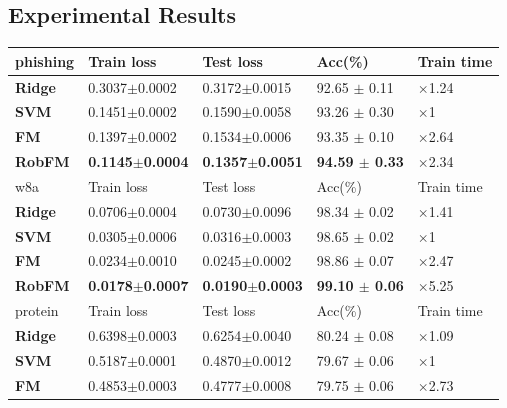 \documentclass[letterpaper]{article} %
\begin{document}
\subsection{Experimental Results}
\begin{table}
	\begin{tabu} to \textwidth {|X[c]| X[c]| X[c]| X[c]| X[c]|}
		\hline
		phishing           & Train loss & Test loss & Acc(\%) & Train time \\
		\hline
		\textbf{Ridge} 	 &0.3037$\pm$0.0002  &0.3172$\pm$0.0015  &  92.65 $\pm$ 0.11 &$\times$1.24   \\ \hline
		\textbf{SVM} 	 &0.1451$\pm$0.0002  &0.1590$\pm$0.0058  &  93.26 $\pm$ 0.30 &$\times$1  \\ \hline
		\textbf{FM} 	  	&0.1397$\pm$0.0002 &0.1534$\pm$0.0006  &93.35 $\pm$ 0.10 &$\times$2.64 \\ \hline
		\textbf{RobFM}   	&\textbf{0.1145$\pm$0.0004} &\textbf{0.1357$\pm$0.0051}  &\textbf{94.59 $\pm$ 0.33}   &$\times$2.34 \\ \hline \hline
		w8a               & Train loss & Test loss & Acc(\%) & Train time \\
		\hline
		\textbf{Ridge} 	 &0.0706$\pm$0.0004  &0.0730$\pm$0.0096  & 98.34 $\pm$ 0.02 &$\times$1.41  \\ \hline
		\textbf{SVM} 	 &0.0305$\pm$0.0006  &0.0316$\pm$0.0003  & 98.65 $\pm$ 0.02 &$\times$1  \\ \hline
		\textbf{FM} 	 &0.0234$\pm$0.0010  &0.0245$\pm$0.0002  & 98.86 $\pm$ 0.07 &$\times$2.47 \\ \hline
		\textbf{RobFM}   &\textbf{0.0178$\pm$0.0007}  &\textbf{0.0190$\pm$0.0003}  &\textbf{99.10 $\pm$ 0.06}   &$\times$5.25 \\ \hline
		\hline
		protein               & Train loss & Test loss & Acc(\%) & Train time  \\
		\hline
		\textbf{Ridge} 	 &0.6398$\pm$0.0003  &0.6254$\pm$0.0040  & 80.24 $\pm$ 0.08  &$\times$1.09  \\ \hline
		\textbf{SVM} 	 &0.5187$\pm$0.0001  &0.4870$\pm$0.0012  & 79.67 $\pm$ 0.06  &$\times$1  \\ \hline
		\textbf{FM} 	 &0.4853$\pm$0.0003  &0.4777$\pm$0.0008  & 79.75 $\pm$ 0.06  &$\times$2.73  \\ \hline

\end{tabu}
\end{table}
\end{document}
